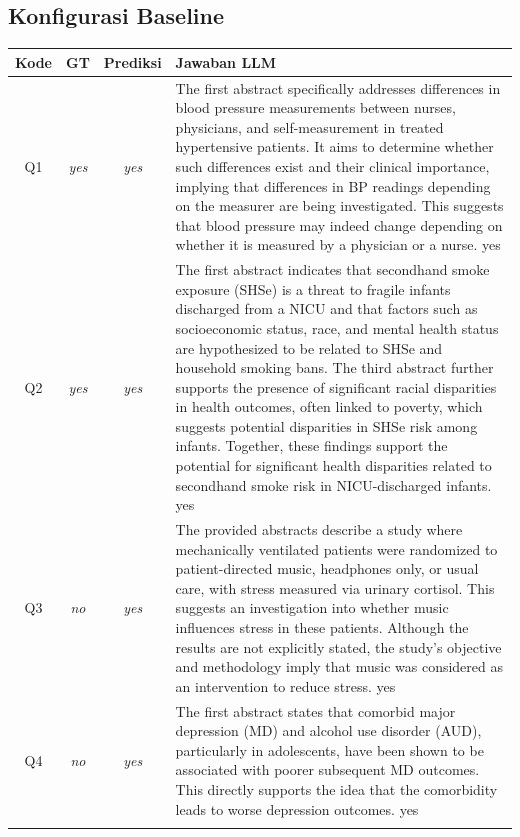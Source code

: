 \subsection*{Konfigurasi Baseline}
\begin{longtable}{@{}c c c >{\raggedright\arraybackslash}p{8.8cm}@{}}
\toprule
\textbf{Kode} & \textbf{GT} & \textbf{Prediksi} & \textbf{Jawaban LLM} \\
\midrule\endhead
Q1 & \textit{yes} & \textit{yes} & The first abstract specifically addresses differences in blood pressure measurements between nurses, physicians, and self-measurement in treated hypertensive patients. It aims to determine whether such differences exist and their clinical importance, implying that differences in BP readings depending on the measurer are being investigated. This suggests that blood pressure may indeed change depending on whether it is measured by a physician or a nurse. yes \\
\addlinespace
Q2 & \textit{yes} & \textit{yes} & The first abstract indicates that secondhand smoke exposure (SHSe) is a threat to fragile infants discharged from a NICU and that factors such as socioeconomic status, race, and mental health status are hypothesized to be related to SHSe and household smoking bans. The third abstract further supports the presence of significant racial disparities in health outcomes, often linked to poverty, which suggests potential disparities in SHSe risk among infants. Together, these findings support the potential for significant health disparities related to secondhand smoke risk in NICU-discharged infants. yes \\
\addlinespace
Q3 & \textit{no} & \textit{yes} & The provided abstracts describe a study where mechanically ventilated patients were randomized to patient-directed music, headphones only, or usual care, with stress measured via urinary cortisol. This suggests an investigation into whether music influences stress in these patients. Although the results are not explicitly stated, the study's objective and methodology imply that music was considered as an intervention to reduce stress. yes \\
\addlinespace
Q4 & \textit{no} & \textit{yes} & The first abstract states that comorbid major depression (MD) and alcohol use disorder (AUD), particularly in adolescents, have been shown to be associated with poorer subsequent MD outcomes. This directly supports the idea that the comorbidity leads to worse depression outcomes. yes \\
\addlinespace

\end{longtable}
